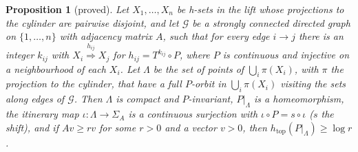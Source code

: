 \documentclass[11pt]{article}
\newtheorem{proposition}{Proposition}
\theoremstyle{definition}
\newcommand{\htop}{h_{\mathrm{top}}}
\begin{document}
\begin{proposition}[proved]\label{prop:sft}
Let $X_1, \ldots, X_n$ be h-sets in the lift whose projections to the cylinder are pairwise disjoint, and let $\mathcal G$ be a strongly connected directed graph on $\{1, \ldots, n\}$ with adjacency matrix $A$, such that for every edge $i \to j$ there is an integer $k_{ij}$ with $X_i \overset{h_{ij}}{\Longrightarrow} X_j$ for $h_{ij} = T^{k_{ij}} \circ P$, where $P$ is continuous and injective on a neighbourhood of each $X_i$. Let $\Lambda$ be the set of points of $\bigcup_i \pi(X_i)$, with $\pi$ the projection to the cylinder, that have a full $P$-orbit in $\bigcup_i\pi(X_i)$ visiting the sets along edges of $\mathcal G$. Then $\Lambda$ is compact and $P$-invariant, $P|_\Lambda$ is a homeomorphism, the itinerary map $\iota: \Lambda \to \Sigma_A$ is a continuous surjection with $\iota \circ P = s \circ \iota$ ($s$ the shift), and if $Av \ge rv$ for some $r > 0$ and a vector $v > 0$, then $\htop(P|_\Lambda) \ge \log r$.
\end{proposition}
\end{document}
